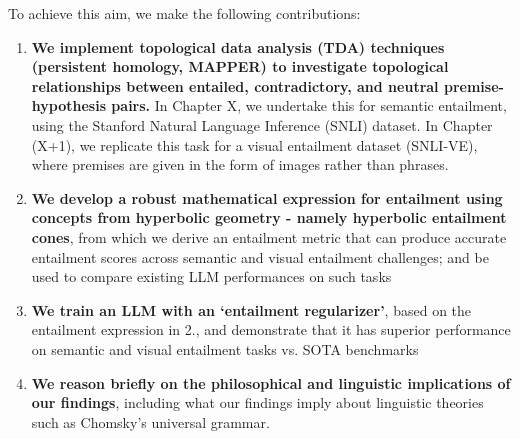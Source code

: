\documentclass[12pt,twoside]{report}
\begin{document}
To achieve this aim, we make the following contributions: 

\begin{enumerate}
    \item \textbf{We implement topological data analysis (TDA) techniques (persistent homology, MAPPER) to investigate topological relationships between entailed, contradictory, and neutral premise-hypothesis pairs.} In Chapter X, we undertake this for semantic entailment, using the Stanford Natural Language Inference (SNLI) dataset. In Chapter (X+1), we replicate this task for a visual entailment dataset (SNLI-VE), where premises are given in the form of images rather than phrases.
    \item \textbf{We develop a robust mathematical expression for entailment using concepts from hyperbolic geometry - namely hyperbolic entailment cones}, from which we derive an entailment metric that can produce accurate entailment scores across semantic and visual entailment challenges; and be used to compare existing LLM performances on such tasks
    \item \textbf{We train an LLM with an `entailment regularizer'}, based on the entailment expression in 2., and demonstrate that it has superior performance on semantic and visual entailment tasks vs. SOTA benchmarks 
    \item \textbf{We reason briefly on the philosophical and linguistic implications of our findings}, including what our findings imply about linguistic theories such as Chomsky's universal grammar. 
\end{enumerate}
\end{document}

